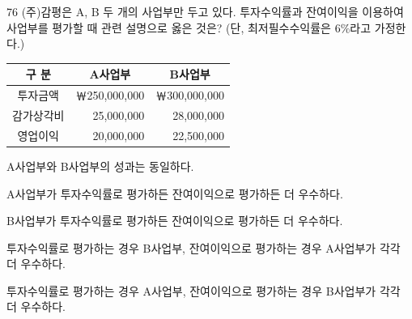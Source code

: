 \begin{question}{76}
(주)감평은 A, B 두 개의 사업부만 두고 있다. 투자수익률과 잔여이익을 이용하여 사업부를 평가할 때 관련 설명으로 옳은 것은? (단, 최저필수수익률은 6\%라고 가정한다.)

{\small\centering
\begin{tabular}{|c|r|r|}\hline
구 분 & \multicolumn{1}{c|}{A사업부} & \multicolumn{1}{c|}{B사업부} \\ \hline
투자금액 & ￦250,000,000 & ￦300,000,000 \\ \hline
감가상각비 & 25,000,000 & 28,000,000 \\ \hline
영업이익 & 20,000,000 & 22,500,000 \\ \hline
\end{tabular}\par}
\begin{choices}
  \item A사업부와 B사업부의 성과는 동일하다.
  \item A사업부가 투자수익률로 평가하든 잔여이익으로 평가하든 더 우수하다.
  \item B사업부가 투자수익률로 평가하든 잔여이익으로 평가하든 더 우수하다.
  \item 투자수익률로 평가하는 경우 B사업부, 잔여이익으로 평가하는 경우 A사업부가 각각 더 우수하다.
  \item 투자수익률로 평가하는 경우 A사업부, 잔여이익으로 평가하는 경우 B사업부가 각각 더 우수하다.
\end{choices}
\end{question}
